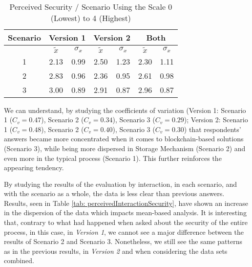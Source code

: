 \begin{table}[htb]
	\centering
	\caption{Perceived Security / Scenario Using the Scale 0 (Lowest) to 4 (Highest)}
	\label{tab: perceivedSecurity}
	\begin{tabular}{c|cc|cc|cc}
		\hline
		Scenario & \multicolumn{2}{c}{\bf Version 1} \vrule & \multicolumn{2}{c}{\bf Version 2} \vrule & \multicolumn{2}{c}{\bf Both}                                             \\
		\hline
		         & $\tilde{x}$                       & $\sigma_{x}$                             & $\tilde{x}$                  & $\sigma_{x}$ & $\tilde{x}$ & $\sigma_{x}$ \\
		\hline
		1        & 2.13                              & 0.99                                     & 2.50                         & 1.23         & 2.30        & 1.11         \\
		\hline
		2        & 2.83                              & 0.96                                     & 2.36                         & 0.95         & 2.61        & 0.98         \\
		\hline
		3        & 3.00                              & 0.89                                     & 2.91                         & 0.87         & 2.96        & 0.87         \\
		\hline
	\end{tabular}
\end{table}

We can understand, by studying the coefficients of variation (Version 1: Scenario 1 ($C_v = 0.47$), Scenario 2 ($C_v = 0.34$), Scenario 3 ($C_v = 0.29$); Version 2: Scenario 1 ($C_v = 0.48$), Scenario 2 ($C_v = 0.40$), Scenario 3 ($C_v = 0.30$) that respondents' answers became more concentrated when it comes to blockchain-based solutions (Scenario 3), while being more dispersed in Storage Mechanism (Scenario 2) and even more in the typical process (Scenario 1). This further reinforces the appearing tendency.

By studying the results of the evaluation by interaction, in each scenario, and with the scenario as a whole, the data is less clear than previous answers. Results, seen in Table \ref{tab: perceivedInteractionSecurity}, have shown an increase in the dispersion of the data which impacts mean-based analysis. It is interesting that, contrary to what had happened when asked about the security of the entire process, in this case, in \textit{Version 1}, we cannot see a major difference between the results of Scenario 2 and Scenario 3. Nonetheless, we still see the same patterns as in the previous results, in \textit{Version 2} and when considering the data sets combined.

